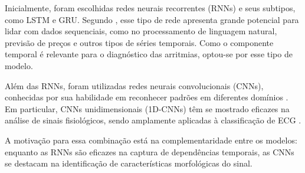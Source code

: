 Inicialmente, foram escolhidas redes neurais recorrentes (RNNs) e seus subtipos, como LSTM e GRU. Segundo , esse tipo de rede apresenta grande potencial para lidar com dados sequenciais, como no processamento de linguagem natural, previsão de preços e outros tipos de séries temporais. Como o componente temporal é relevante para o diagnóstico das arritmias, optou-se por esse tipo de modelo.

Além das RNNs, foram utilizadas redes neurais convolucionais (CNNs), conhecidas por sua habilidade em reconhecer padrões em diferentes domínios . Em particular, CNNs unidimensionais (1D-CNNs) têm se mostrado eficazes na análise de sinais fisiológicos, sendo amplamente aplicadas à classificação de ECG \cite{narotamo2024}.

A motivação para essa combinação está na complementaridade entre os modelos: enquanto as RNNs são eficazes na captura de dependências temporais, as CNNs se destacam na identificação de características morfológicas do sinal.
